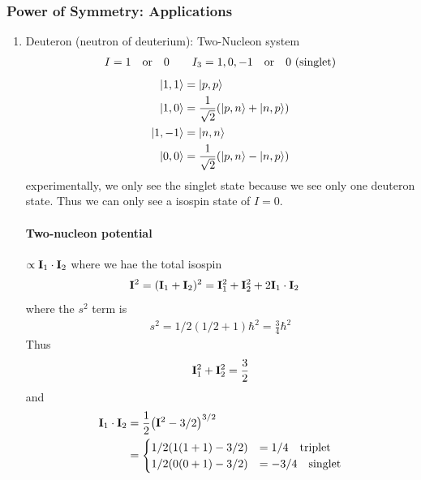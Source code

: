 \documentclass[../main.tex]{subfiles}
\begin{document}
\subsubsection*{Power of Symmetry: Applications}
\begin{enumerate}
    \item Deuteron (neutron of deuterium): Two-Nucleon system
\begin{align*}
    I = 1 \qor 0 \qquad I_3 = 1, 0, -1 \qor 0 \textrm{ (singlet)}
\end{align*}
\begin{align*}
    \ket{1,1} &= \ket{p, p} \\
    \ket{1,0} &= \frac{1}{\sqrt{2}} (\ket{p, n} + \ket{n, p}) \\
    \ket{1,-1} &= \ket{n, n} \\
    \ket{0,0} &= \frac{1}{\sqrt{2}} (\ket{p, n} - \ket{n, p})
\end{align*}
experimentally, we only see the singlet state because we see only one deuteron state. Thus we can
only see a isospin state of $I = 0$.

\paragraph{Two-nucleon potential} $\propto \vb{I}_1 \cdot \vb{I}_2$ where we hae the total isospin
\begin{align*}
    \vb{I}^2 = (\vb{I}_1 + \vb{I}_2)^2 &= \vb{I}_1^2 + \vb{I}_2^2 + 2 \vb{I}_1 \cdot \vb{I}_2
\end{align*}
where the $s^2$ term is
\begin{align*}
    s^2 = 1/2 (1/2 + 1) \hbar^2 = \frac{3}{4} \hbar^2
\end{align*}
Thus
\begin{align*}
    \vb{I}_1^2 + \vb{I}_2^2 = \frac{3}{2}
\end{align*}
and
\begin{align*}
    \vb{I}_1 \cdot \vb{I}_2 &= \frac{1}{2} \qt(\vb{I}^2 - 3/2)^{3/2} \\
    &= \begin{cases}
        1/2(1(1+1) -3/2) &= 1/4 \quad \textrm{triplet} \\
        1/2(0(0+1) -3/2) &= -3/4 \quad \textrm{singlet}
    \end{cases}
\end{align*}
\end{enumerate}

\newpage
{}
\end{document}
